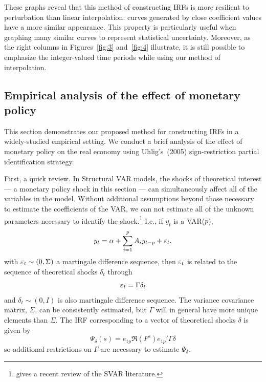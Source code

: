 \documentclass[12pt,fleqn]{article}
\begin{document}
These graphs reveal that this method of constructing IRFs is more
resilient to perturbation than linear interpolation: curves generated
by close coefficient values have a more similar appearance. This
property is particularly useful when graphing many similar curves to
represent statistical uncertainty. Moreover, as the right columns in
Figures~\ref{fig:3} and~\ref{fig:4} illustrate, it is still possible
to emphasize the integer-valued time periods while using our method of
interpolation.

\subsection{Empirical analysis of the effect of monetary policy}
\label{S3.2}

This section demonstrates our proposed method for constructing IRFs
in a widely-studied empirical setting. We conduct a brief analysis of
the effect of monetary policy on the real economy using Uhlig's~(2005)
sign-restriction partial identification strategy.

First, a quick review. In Structural VAR models, the shocks of
theoretical interest --- a monetary policy shock in this section ---
can simultaneously affect all of the variables in the model. Without
additional assumptions beyond those necessary to estimate the
coefficients of the VAR, we can not estimate all of the unknown
parameters necessary to identify the shock.\footnote{%
  \citet{Kil:13} gives a recent review of the SVAR literature.} %
I.e., if $y_t$ is a VAR($p$),
\begin{equation}
  \label{eq:13}
  y_t = \alpha + \sum_{i=1}^p A_i y_{t-p} + \varepsilon_t,
\end{equation}
with $\varepsilon_t \sim (0, \Sigma)$ a martingale difference sequence, then
$\varepsilon_t$ is related to the sequence of theoretical shocks $\delta_t$
through
\begin{equation*}
  \varepsilon_t = \Gamma \delta_t
\end{equation*}
and $\delta_t \sim (0, I)$ is also martingale difference sequence. The
variance covariance matrix, $\Sigma$, can be consistently estimated,
but $\Gamma$ will in general have more unique elements than $\Sigma$.
The IRF corresponding to a vector of theoretical shocks $\delta$ is
given by
\begin{equation}
  \label{eq:14}
  \Psi_\delta(s) = e_{1p} \Re(F^s) e_{1p}' \Gamma \delta
\end{equation}
so additional restrictions on $\Gamma$ are necessary to estimate
$\Psi_\delta$.
\end{document}
